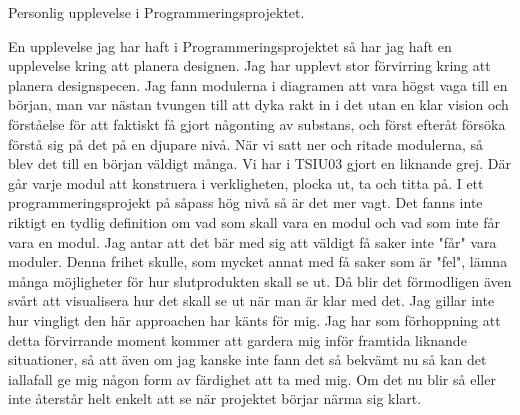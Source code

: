 Personlig upplevelse i Programmeringsprojektet.

En upplevelse jag har haft i Programmeringsprojektet så har jag haft en upplevelse kring att planera designen. Jag har upplevt stor förvirring kring att planera designspecen. Jag fann modulerna i diagramen att vara högst vaga till en början, man var nästan tvungen till att dyka rakt in i det utan en klar vision och förståelse för att faktiskt få gjort någonting av substans, och först efteråt  försöka förstå sig på det på en djupare nivå.
När vi satt ner och ritade modulerna, så blev det till en början väldigt många. Vi har i TSIU03 gjort en liknande grej. Där går varje modul att konstruera i verkligheten, plocka ut, ta och titta på. I ett programmeringsprojekt på såpass hög nivå så är det mer vagt. Det fanns inte riktigt en tydlig definition om vad som skall vara en modul och vad som inte får vara en modul. Jag antar att det bär med sig att väldigt få saker inte "får" vara moduler. Denna frihet skulle, som mycket annat med få saker som är "fel", lämna många möjligheter för hur slutprodukten skall se ut. Då blir det förmodligen även svårt att visualisera hur det skall se ut när man är klar med det. 
Jag gillar inte hur vingligt den här approachen har känts för mig. Jag har som förhoppning att detta förvirrande moment kommer att gardera mig inför framtida liknande situationer, så att även om jag kanske inte fann det så bekvämt nu så kan det iallafall ge mig någon form av färdighet att ta med mig. Om det nu blir så eller inte återstår helt enkelt att se när projektet börjar närma sig klart. 
